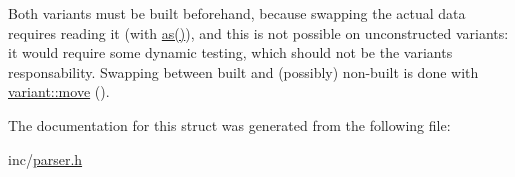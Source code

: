 Both variants must be built beforehand, because swapping the actual data requires reading it (with \hyperlink{structyy_1_1variant_a7fae4866c8d57a6f2ea30e9926e367cd}{as()}), and this is not possible on unconstructed variants\+: it would require some dynamic testing, which should not be the variant\textquotesingle{}s responsability. Swapping between built and (possibly) non-\/built is done with \hyperlink{structyy_1_1variant_ae71b4ef21f1446b328b9d93dbc6806e1}{variant\+::move} (). 

The documentation for this struct was generated from the following file\+:\begin{DoxyCompactItemize}
\item 
inc/\hyperlink{parser_8h}{parser.\+h}\end{DoxyCompactItemize}

